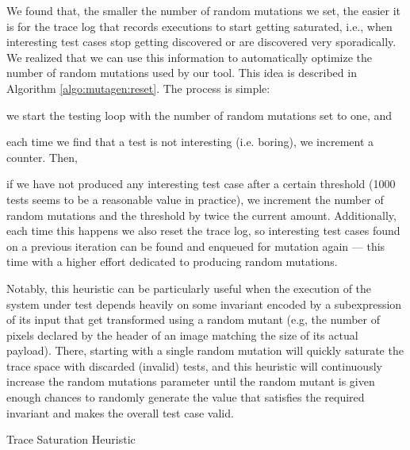 \documentclass[sigconf,review,anonymous]{acmart}
\begin{document}
We found that, the smaller the number of random mutations we set, the easier it
is for the trace log that records executions to start getting saturated, i.e.,
when interesting test cases stop getting discovered or are discovered very
sporadically.
%
We realized that we can use this information to automatically optimize the
number of random mutations used by our tool.
%
This idea is described in Algorithm \ref{algo:mutagen:reset}.
%
The process is simple:
%
\begin{inparaenum}
  \item we start the testing loop with the number of random mutations set to
    one, and
  \item each time we find that a test is not interesting (i.e. boring), we
    increment a counter.
  Then,
  \item if we have not produced any interesting test case after a certain
    threshold (1000 tests seems to be a reasonable value in practice), we
    increment the number of random mutations and the threshold by twice the
    current amount.
    Additionally, each time this happens we also reset the trace log, so
    interesting test cases found on a previous iteration can be found and
    enqueued for mutation again --- this time with a higher effort dedicated to
    producing random mutations.
\end{inparaenum}

Notably, this heuristic can be particularly useful when the execution of the
system under test depends heavily on some invariant encoded by a subexpression
of its input that get transformed using a random mutant (e.g, the number of
pixels declared by the header of an image matching the size of its actual
payload).
%
There, starting with a single random mutation will quickly saturate the trace
space with discarded (invalid) tests, and this heuristic will continuously
increase the random mutations parameter until the random mutant is given enough
chances to randomly generate the value that satisfies the required invariant and
makes the overall test case valid.

\begin{algorithm}[t]
  \SetAlgoLined
  \DontPrintSemicolon

\caption{\label{algo:mutagen:reset}Trace Saturation Heuristic}
\end{algorithm}
\end{document}
